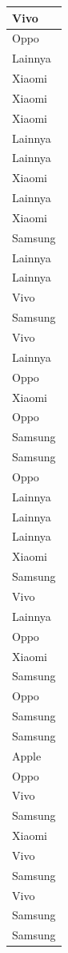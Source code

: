 \documentclass[
  letterpaper,
  DIV=11,
  numbers=noendperiod]{scrartcl}
\begin{document}
\begin{table}
\begin{tabular}[t]{l}
\hline
Vivo\\
\hline
Oppo\\
\hline
Lainnya\\
\hline
Xiaomi\\
\hline
Xiaomi\\
\hline
Xiaomi\\
\hline
Lainnya\\
\hline
Lainnya\\
\hline
Xiaomi\\
\hline
Lainnya\\
\hline
Xiaomi\\
\hline
Samsung\\
\hline
Lainnya\\
\hline
Lainnya\\
\hline
Vivo\\
\hline
Samsung\\
\hline
Vivo\\
\hline
Lainnya\\
\hline
Oppo\\
\hline
Xiaomi\\
\hline
Oppo\\
\hline
Samsung\\
\hline
Samsung\\
\hline
Oppo\\
\hline
Lainnya\\
\hline
Lainnya\\
\hline
Lainnya\\
\hline
Xiaomi\\
\hline
Samsung\\
\hline
Vivo\\
\hline
Lainnya\\
\hline
Oppo\\
\hline
Xiaomi\\
\hline
Samsung\\
\hline
Oppo\\
\hline
Samsung\\
\hline
Samsung\\
\hline
Apple\\
\hline
Oppo\\
\hline
Vivo\\
\hline
Samsung\\
\hline
Xiaomi\\
\hline
Vivo\\
\hline
Samsung\\
\hline
Vivo\\
\hline
Samsung\\
\hline
Samsung\\

\end{tabular}
\end{table}
\end{document}
